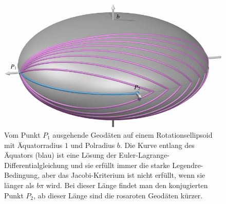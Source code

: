 %
%
%
\begin{figure}
\centering
\includegraphics{chapters/060-variation2/examples/geodesics.pdf}
\caption{Vom Punkt $P_1$ ausgehende Geodäten auf einem Rotationsellipsoid
mit Äquatorradius $1$ und Polradius $b$.
Die Kurve entlang des Äquators (blau) ist eine Lösung der
Euler-Lagrange-Differentialgleichung und sie erfüllt immer die starke
Legendre-Bedingung, aber das Jacobi-Kriterium ist nicht erfüllt, wenn 
sie länger als $b\pi$ wird.
Bei dieser Länge findet man den konjugierten Punkt $P_2$, ab
dieser Länge sind die rosaroten Geodäten kürzer.
\label{buch:variation2:fig:geodaeten}}
\end{figure}
